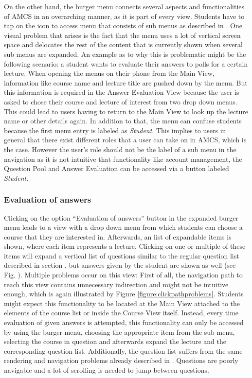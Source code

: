 On the other hand, the burger menu connects several aspects and functionalities of AMCS in an overarching manner, as it is part of every view. Students have to tap on the icon to access menu that consists of sub menus as described in \todosct. 
One visual problem that arises is the fact that the menu uses a lot of vertical screen space and delocates the rest of the content that is currently shown when several sub menus are expanded. An example as to why this is problematic might be the following scenario: a student wants to evaluate their answers to polls for a certain lecture. When opening the menus on their phone from the Main View, information like course name and lecture title are pushed down by the menu. But this information is required in the Answer Evaluation View because the user is asked to chose their course and lecture of interest from two drop down menus. This could lead to users having to return to the Main View to look up the lecture name or other details again.
In addition to that, the menu can confuse students because the first menu entry is labeled as \emph{Student}. This implies to users in general that there exist different roles that a user can take on in AMCS, which is the case. However the user's role should not be the label of a sub menu in the navigation as it is not intuitive that functionality like account management, the Question Pool and Answer Evaluation can be accessed via a button labeled \emph{Student}.

\subsubsection{Evaluation of answers}

Clicking on the option “Evaluation of answers” button in the expanded burger menu leads to a view with a drop down menu from which students can choose a course that they are interested in. Afterwards, an list of expandable items is shown, where each item represents a lecture. Clicking on one or multiple of these items will expand a vertical list of questions similar to  the regular question list described in section \todosct, but answers given by the student are shown as well (see Fig. \todosct).
Multiple problems occur on this view: First of all, the navigation path to reach this view contains unnecessary indirection and might not be intuitive enough, which is again illustrated by Figure \ref{figure:clickpathproblems}. Students might expect this functionality to be located at the Main View attached to the elements of the course list or inside the Course View itself. Instead, every time evaluation of given answers is attempted, this functionality can only be accessed by using the burger menu, choosing the appropriate item from the sub menu, selecting the course in question and afterwards expand the lecture and the corresponding question list.
Additionally, the question list suffers from the same rendering and navigation problems already described in \todosct. Questions are poorly navigable and a lot of scrolling is needed to jump between questions.



